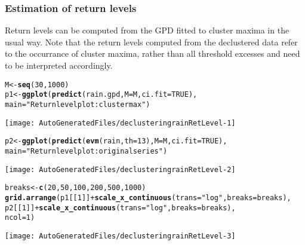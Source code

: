 \documentclass[10pt]{article}\usepackage[]{graphicx}\usepackage[]{color}
\makeatletter
\def\maxwidth{ %
  \ifdim\Gin@nat@width>\linewidth
    \linewidth
  \else
    \Gin@nat@width
  \fi
}
\newcommand{\hlnum}[1]{\textcolor[rgb]{0.686,0.059,0.569}{#1}}%
\newcommand{\hlstr}[1]{\textcolor[rgb]{0.192,0.494,0.8}{#1}}%
\newcommand{\hlopt}[1]{\textcolor[rgb]{0,0,0}{#1}}%
\newcommand{\hlstd}[1]{\textcolor[rgb]{0.345,0.345,0.345}{#1}}%
\newcommand{\hlkwb}[1]{\textcolor[rgb]{0.69,0.353,0.396}{#1}}%
\newcommand{\hlkwc}[1]{\textcolor[rgb]{0.333,0.667,0.333}{#1}}%
\newcommand{\hlkwd}[1]{\textcolor[rgb]{0.737,0.353,0.396}{\textbf{#1}}}%
\newenvironment{kframe}{%
 \def\at@end@of@kframe{}%
 \ifinner\ifhmode%
  \def\at@end@of@kframe{\end{minipage}}%
  \begin{minipage}{\columnwidth}%
 \fi\fi%
 \def\FrameCommand##1{\hskip\@totalleftmargin \hskip-\fboxsep
 \colorbox{shadecolor}{##1}\hskip-\fboxsep
     \hskip-\linewidth \hskip-\@totalleftmargin \hskip\columnwidth}%
 \MakeFramed {\advance\hsize-\width
   \@totalleftmargin\z@ \linewidth\hsize
   \@setminipage}}%
 {\par\unskip\endMakeFramed%
 \at@end@of@kframe}
\newenvironment{knitrout}{}{} %
\makeatother
\begin{document}
\subsubsection*{Estimation of return levels}

Return levels can be computed from the GPD fitted to cluster maxima in the usual way.  Note that the return levels computed from the declustered data refer to the occurrance of cluster maxima, rather than all threshold excesses and need to be interpreted accordingly.


\begin{knitrout}
\color{fgcolor}\begin{kframe}
\begin{alltt}
\hlstd{M} \hlkwb{<-} \hlkwd{seq}\hlstd{(}\hlnum{30}\hlstd{,}\hlnum{1000}\hlstd{)}
\hlstd{p1} \hlkwb{<-} \hlkwd{ggplot}\hlstd{(}\hlkwd{predict}\hlstd{(rain.gpd,}\hlkwc{M}\hlstd{=M,}\hlkwc{ci.fit}\hlstd{=}\hlnum{TRUE}\hlstd{),}
             \hlkwc{main}\hlstd{=}\hlstr{"Return level plot: cluster max"}\hlstd{)}
\end{alltt}
\end{kframe}
\texttt{[image: AutoGeneratedFiles/declusteringrainRetLevel-1]} 
\begin{kframe}\begin{alltt}
\hlstd{p2} \hlkwb{<-} \hlkwd{ggplot}\hlstd{(}\hlkwd{predict}\hlstd{(}\hlkwd{evm}\hlstd{(rain,}\hlkwc{th}\hlstd{=}\hlnum{13}\hlstd{),}\hlkwc{M}\hlstd{=M,}\hlkwc{ci.fit}\hlstd{=}\hlnum{TRUE}\hlstd{),}
             \hlkwc{main}\hlstd{=}\hlstr{"Return level plot: original series"}\hlstd{)}
\end{alltt}
\end{kframe}
\texttt{[image: AutoGeneratedFiles/declusteringrainRetLevel-2]} 
\begin{kframe}\begin{alltt}
\hlstd{breaks} \hlkwb{<-} \hlkwd{c}\hlstd{(}\hlnum{20}\hlstd{,}\hlnum{50}\hlstd{,}\hlnum{100}\hlstd{,}\hlnum{200}\hlstd{,}\hlnum{500}\hlstd{,}\hlnum{1000}\hlstd{)}
\hlkwd{grid.arrange}\hlstd{(p1[[}\hlnum{1}\hlstd{]]} \hlopt{+} \hlkwd{scale_x_continuous}\hlstd{(}\hlkwc{trans}\hlstd{=}\hlstr{"log"}\hlstd{,}\hlkwc{breaks}\hlstd{=breaks),}
             \hlstd{p2[[}\hlnum{1}\hlstd{]]} \hlopt{+} \hlkwd{scale_x_continuous}\hlstd{(}\hlkwc{trans}\hlstd{=}\hlstr{"log"}\hlstd{,}\hlkwc{breaks}\hlstd{=breaks),}
             \hlkwc{ncol}\hlstd{=}\hlnum{1}\hlstd{)}
\end{alltt}
\end{kframe}
\texttt{[image: AutoGeneratedFiles/declusteringrainRetLevel-3]} 

\end{knitrout}
\end{document}
